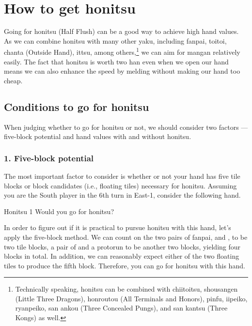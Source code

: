 \newpage
\section{How to get {\jap honitsu}}\label{sec:hon}
Going for {\jap honitsu} (Half Flush) can be a good way to achieve high hand values. As we can combine {\jap honitsu} with many other {\jap yaku}, including {\jap fanpai}, {\jap toitoi}, {\jap chanta} (Outside Hand), {\jap ittsu}, among others,\footnote{Technically speaking, {\jap honitsu} can be combined with {\jap chiitoitsu}, {\jap shousangen} (Little Three Dragons), {\jap honroutou} (All Terminals and Honors), {\jap pinfu}, {\jap iipeiko}, {\jap ryanpeiko}, {\jap san ankou} (Three Concealed Pungs), and {\jap san kantsu} (Three Kongs) as well.}
we can aim for {\jap mangan} relatively easily.
The fact that {\jap honitsu} is worth two {\jap han} even when we open our hand means we can also enhance the speed by melding without making our hand too cheap.

\subsection{Conditions to go for {\jap honitsu}}
When judging whether to go for {\jap honitsu} or not, we should consider two factors --- five-block potential and hand values with and without {\jap honitsu}.

\subsubsection{1. Five-block potential}
\noindent The most important factor to consider is whether or not your hand has  five tile blocks or block candidates (i.e., floating tiles) necessary for {\jap honitsu}. Assuming you are the South player in the 6th turn in East-1, consider the following hand. 

\begin{itembox}[r]{{\jap Honitsu} 1}
\bp
{}\dong\dong\xi\zhong\zhong
\ep
\vspace{-10pt}Would you go for {\jap honitsu}? \vspace{-5pt}
\end{itembox}
\noindent
In order to figure out if it is practical to pursue {\jap honitsu} with this hand, let's apply the five-block method. 
\emj
We can count on the two pairs of {\jap fanpai}, {\LARGE\dong\dong} and {\LARGE\zhong\zhong}, to be two tile blocks, a pair of {\LARGE{}} and a protorun {\LARGE{}} to be another two blocks, yielding four blocks in total. In addition, we can reasonably expect either of the two floating tiles {\LARGE\xi}{\LARGE{}} to produce the fifth block. Therefore, you can go for {\jap honitsu} with this hand. 

